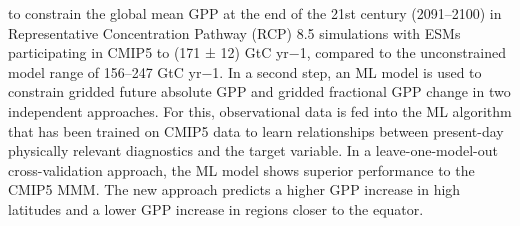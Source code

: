 {  to constrain the global mean GPP at the end of the 21st century (2091–2100)
  in Representative Concentration Pathway (RCP) 8.5 simulations with ESMs
  participating in CMIP5 to (171 ± 12) GtC yr−1, compared to the unconstrained
  model range of 156–247 GtC yr−1. In a second step, an ML model is used to
  constrain gridded future absolute GPP and gridded fractional GPP change in
  two independent approaches. For this, observational data is fed into the ML
  algorithm that has been trained on CMIP5 data to learn relationships between
  present-day physically relevant diagnostics and the target variable. In a
  leave-one-model-out cross-validation approach, the ML model shows superior
  performance to the CMIP5 MMM. The new approach predicts a higher GPP increase
  in high latitudes and a lower GPP increase in regions closer to the equator.%
}
